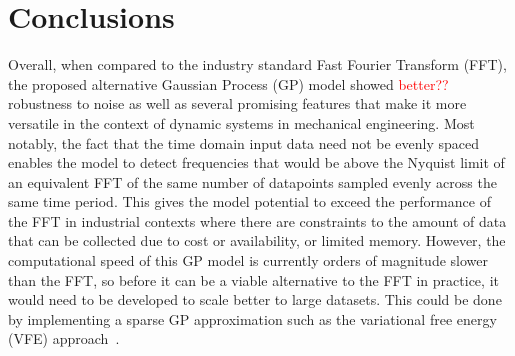 \documentclass[12pt]{article}
\begin{document}
    \section{Conclusions}
    Overall, when compared to the industry standard Fast Fourier Transform (FFT), the proposed alternative Gaussian Process (GP) model showed \textcolor{red}{better??} robustness to noise as well as several promising features that make it more versatile in the context of dynamic systems in mechanical engineering.
    Most notably, the fact that the time domain input data need not be evenly spaced enables the model to detect frequencies that would be above the Nyquist limit of an equivalent FFT of the same number of datapoints sampled evenly across the same time period.
    This gives the model potential to exceed the performance of the FFT in industrial contexts where there are constraints to the amount of data that can be collected due to cost or availability, or limited memory.
    However, the computational speed of this GP model is currently orders of magnitude slower than the FFT, so before it can be a viable alternative to the FFT in practice, it would need to be developed to scale better to large datasets.
    This could be done by implementing a sparse GP approximation such as the variational free energy (VFE) approach~\cite{murphy2023probabilistic}.

    \FloatBarrier

    \newpage
    \printbibliography
    \newpage
    
\end{document}
